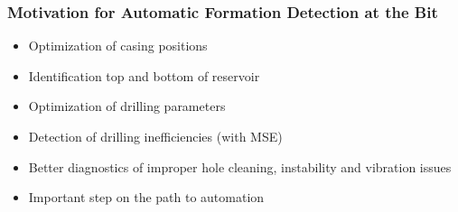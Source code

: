 \documentclass{beamer}
\begin{document}
\begin{frame} \frametitle{Motivation for Automatic Formation Detection at the Bit} 
\vspace{-1cm}

\begin{itemize}
\item<1-> Optimization of casing positions 
\item<2-> Identification top and bottom of reservoir
\item<3-> Optimization of drilling parameters
\item<4-> Detection of drilling inefficiencies (with MSE)
\item<5-> Better diagnostics of improper hole cleaning, instability and vibration issues
\item<6-> Important step on the path to automation
\end{itemize}

\end{frame}
\end{document}
